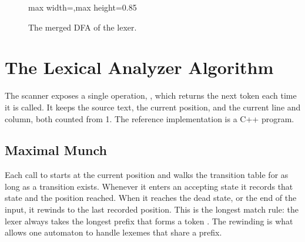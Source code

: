 \begin{figure}[H]
\begin{adjustbox}{max width=\linewidth,max height=0.85\textheight}
\end{adjustbox}
\caption{The merged DFA of the lexer.}
\label{fig:dfa-merged}
\end{figure}

\section{The Lexical Analyzer Algorithm}
\label{sec:lexer-algorithm}

The scanner exposes a single operation, , which returns the next
token each time it is called. It keeps the source text, the current position,
and the current line and column, both counted from 1. The reference
implementation is a C++ program.

\subsection{Maximal Munch}

Each call to  starts at the current position and walks the
transition table for as long as a transition exists. Whenever it enters an
accepting state it records that state and the position reached. When it
reaches the dead state, or the end of the input, it rewinds to the last
recorded position. This is the longest match rule: the lexer always takes the
longest prefix that forms a token \cite{aho2006compilers}. The rewinding is
what allows one automaton to handle lexemes that share a prefix.

